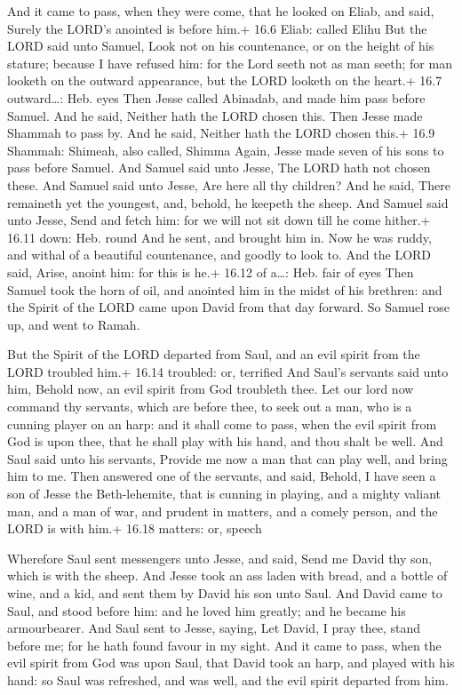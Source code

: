  And it came to pass, when they were come, that he looked
on Eliab, and said, Surely the LORD's anointed is before him.+ 16.6
Eliab: called Elihu  But the LORD said unto Samuel, Look not
on his countenance, or on the height of his stature; because I have
refused him: for the Lord seeth not as man seeth; for man looketh on the
outward appearance, but the LORD looketh on the heart.+ 16.7
outward\ldots: Heb. eyes  Then Jesse called Abinadab, and
made him pass before Samuel. And he said, Neither hath the LORD chosen
this.  Then Jesse made Shammah to pass by. And he said,
Neither hath the LORD chosen this.+ 16.9 Shammah: Shimeah, also called,
Shimma  Again, Jesse made seven of his sons to pass before
Samuel. And Samuel said unto Jesse, The LORD hath not chosen these.
 And Samuel said unto Jesse, Are here all thy children? And
he said, There remaineth yet the youngest, and, behold, he keepeth the
sheep. And Samuel said unto Jesse, Send and fetch him: for we will not
sit down till he come hither.+ 16.11 down: Heb. round  And
he sent, and brought him in. Now he was ruddy, and withal of a beautiful
countenance, and goodly to look to. And the LORD said, Arise, anoint
him: for this is he.+ 16.12 of a\ldots: Heb. fair of eyes 
Then Samuel took the horn of oil, and anointed him in the midst of his
brethren: and the Spirit of the LORD came upon David from that day
forward. So Samuel rose up, and went to Ramah.

 But the Spirit of the LORD departed from Saul, and an
evil spirit from the LORD troubled him.+ 16.14 troubled: or, terrified
 And Saul's servants said unto him, Behold now, an evil
spirit from God troubleth thee.  Let our lord now command
thy servants, which are before thee, to seek out a man, who is a cunning
player on an harp: and it shall come to pass, when the evil spirit from
God is upon thee, that he shall play with his hand, and thou shalt be
well.  And Saul said unto his servants, Provide me now a
man that can play well, and bring him to me.  Then answered
one of the servants, and said, Behold, I have seen a son of Jesse the
Beth-lehemite, that is cunning in playing, and a mighty valiant man, and
a man of war, and prudent in matters, and a comely person, and the LORD
is with him.+ 16.18 matters: or, speech

 Wherefore Saul sent messengers unto Jesse, and said,
Send me David thy son, which is with the sheep.  And Jesse
took an ass laden with bread, and a bottle of wine, and a kid, and sent
them by David his son unto Saul.  And David came to Saul,
and stood before him: and he loved him greatly; and he became his
armourbearer.  And Saul sent to Jesse, saying, Let David, I
pray thee, stand before me; for he hath found favour in my sight.
 And it came to pass, when the evil spirit from God was
upon Saul, that David took an harp, and played with his hand: so Saul
was refreshed, and was well, and the evil spirit departed from him.

